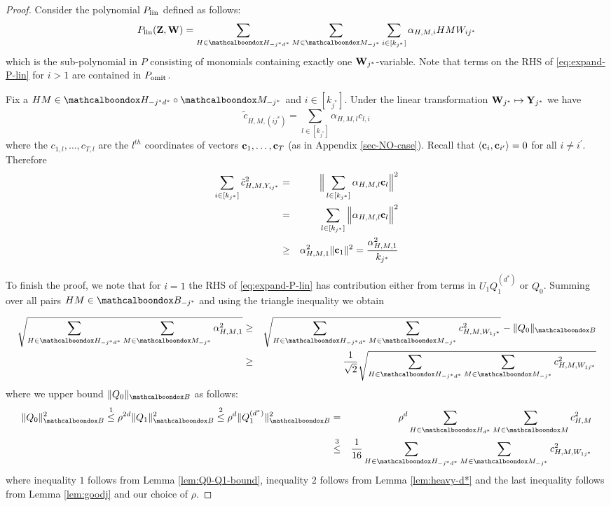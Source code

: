 \begin{proof}
	Consider the polynomial $P_{\rm lin}$ defined as follows:
	\begin{equation}				\label{eq:expand-P-lin}
	P_{\rm lin}({\bf Z},{\bf W}) = \sum_{H \in \mcb{H}_{-j^*d^*}}\sum_{M \in \mcb{M}_{-j^*}}\sum_{i \in [k_{j^*}]}\alpha_{H,M,i}HMW_{ij^*}
	\end{equation}
	\noindent which is the sub-polynomial in $P$ consisting of monomials containing exactly one ${\bf W}_{j^*}$-variable. Note that terms on the RHS of \eqref{eq:expand-P-lin} for $i > 1$ 
are contained in $P_{\textnormal{omit}}$.    

	Fix a $HM \in \mcb{H}_{-j^*d^*} \circ \mcb{M}_{-j^*}$ and $i \in [k_{j^*}]$. Under the linear transformation ${\bf W}_{j^*} \mapsto {\bf Y}_{j^*}$ we have
	\begin{equation}
	\tilde{c}_{H,M,({ij^*})} = \sum_{ l \in [k_{j^*}] }\alpha_{H,M,l}c_{l,i}
	\end{equation}
	where the $c_{1,l},\ldots,{c}_{T,l}$ are the $l^{th}$ coordinates of vectors ${\bf c}_1,\ldots,{\bf c}_T$ (as in Appendix \ref{sec-NO-case}). Recall that $\langle {\bf c}_i,{\bf c}_{i^\prime} \rangle = 0$ for all $i \ne i^\prime$. Therefore
	\begin{eqnarray}
	\sum_{i \in [k_{j^*}]} \tilde{c}^2_{H,M,Y_{ij^*}} &=& \Big\|\sum_{ l \in [k_{j^*}] }\alpha_{H,M,l}{\bf c}_{l}\Big\|^2   \\
											   &=& \sum_{ l \in [k_{j^*}] }\Big\|\alpha_{H,M,l}{\bf c}_{l}\Big\|^2   \\
											   &\ge& \alpha^2_{H,M,1}\|{\bf c}_{1}\|^2 = \frac{\alpha^2_{H,M,1}}{k_{j^*}} 
	\end{eqnarray}
	
	To finish the proof, we note that for $i = 1$ the RHS of \eqref{eq:expand-P-lin} has contribution either from terms in $U_1Q_1^{(d^*)}$ or $Q_0$. 
	 Summing over all pairs $HM \in \mcb{B}_{-j^*}$ and using the triangle inequality we obtain 
	
	\begin{eqnarray}
	\sqrt{\sum_{H \in \mcb{H}_{-j^*d^*}}\sum_{M \in \mcb{M}_{-j^*} }\alpha^2_{H,M,1}} &\ge& \sqrt{\sum_{H \in \mcb{H}_{-j^*d^*}}\sum_{M \in \mcb{M}_{-j^*}} c^2_{H,M,W_{1j^*}}} - \|Q_0\|_{\basisA} \\
	&\ge& \frac{1}{\sqrt{2}}\sqrt{\sum_{H \in \mcb{H}_{-j^*d^*}}\sum_{M \in \mcb{M}_{-j^*}} c^2_{H,M,W_{1j^*}}}  
	\end{eqnarray}
	\noindent where we upper bound $\|Q_0\|_{\basisA}$ as follows:
	\begin{eqnarray}
	\|Q_0\|^2_{\basisA} \overset{1}{\le} \rho^{2d}\|Q_1\|^2_{\basisA} \overset{2}{\le} \rho^{d}\|Q^{(d^*)}_1\|^2_{\basisA} 
	&=& \rho^d\sum_{H \in \mcb{H}_{d^*}}\sum_{M \in \mcb{M}} c^2_{H,M} \\
	&\overset{3}{\le}& \frac{1}{16}   \sum_{H \in \mcb{H}_{-j^*d^*}}\sum_{M \in \mcb{M}_{-j^*}} c^2_{H,M,W_{1j^*}}  
	\end{eqnarray}
	\noindent where inequality $1$ follows from Lemma \ref{lem:Q0-Q1-bound}, inequality $2$ follows from Lemma \ref{lem:heavy-d*} and the last inequality follows from Lemma \ref{lem:goodj} and our choice of $\rho$.
\end{proof}




